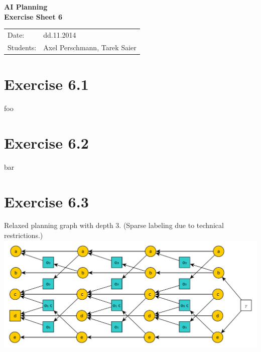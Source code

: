 \documentclass[11pt,a4paper]{article}
\begin{document}
\begin{center}
\Huge{\textbf{AI Planning}}\\
\LARGE{\textbf{Exercise Sheet 6}}
\end{center}
\vspace{2cm}
\begin{tabular}{ll}
Date: & dd.11.2014\\
Students: & Axel Perschmann, Tarek Saier
\end{tabular}

\section*{Exercise 6.1}
foo

\section*{Exercise 6.2}
bar

\section*{Exercise 6.3}
Relaxed planning graph with depth 3. (Sparse labeling due to technical restrictions.)
\includegraphics[scale=0.6]{g631}\\
\end{document}
